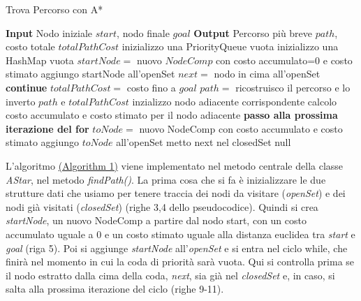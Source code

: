 \documentclass[12pt,a4paper]{report}
\begin{document}
\newpage

\begin{algorithm}
\caption{Trova Percorso con A*}
\label{alg:A-Star}
\begin{algorithmic}[1]
    \State \textbf{Input} Nodo iniziale $start$, nodo finale $goal$
    \State \textbf{Output} Percorso più breve $path$, costo totale $totalPathCost$
    \State inizializzo una PriorityQueue vuota
    \State inizializzo una HashMap vuota
    \State $startNode=$ nuovo $NodeComp$ con costo accumulato=0 e costo stimato
    \State aggiungo startNode all'openSet
        \State $next=$ nodo in cima all'openSet
            \State \textbf{continue}
        \EndIf
            \State $totalPathCost=$ costo fino a $goal$
            \State $path=$ ricostruisco il percorso e lo inverto
            \State \Return $path$ e $totalPathCost$
        \EndIf
            \State inzializzo nodo adiacente corrispondente
            \State calcolo costo accumulato e costo stimato per il nodo adiacente
                \State \textbf{passo alla prossima iterazione del for}
            \EndIf
            \State $toNode=$ nuovo NodeComp con costo accumulato e costo stimato
            \State aggiungo $toNode$ all'openSet
        \EndFor
        \State metto next nel closedSet
    \EndWhile
    \State \Return null
\end{algorithmic}
\end{algorithm}

L'algoritmo \hyperref[alg:A-Star]{(Algorithm 1)} viene implementato nel metodo centrale della classe \textit{AStar}, nel metodo \textit{findPath()}. 
La prima cosa che si fa è inizializzare le due strutture dati che usiamo per tenere traccia dei nodi da visitare (\textit{openSet}) e dei nodi già visitati (\textit{closedSet}) (righe 3,4 dello pseudocodice). Quindi si crea \textit{startNode}, un nuovo NodeComp a partire dal nodo start, con un costo accumulato uguale a 0 e un costo stimato uguale alla distanza euclidea tra \textit{start} e \textit{goal} (riga 5).
Poi si aggiunge \textit{startNode} all'\textit{openSet} e si entra nel ciclo while, che finirà nel momento in cui la coda di priorità sarà vuota. 
Qui si controlla prima se il nodo estratto dalla cima della coda, \textit{next}, sia già nel \textit{closedSet} e, in caso, si salta alla prossima iterazione del ciclo (righe 9-11).
\end{document}
